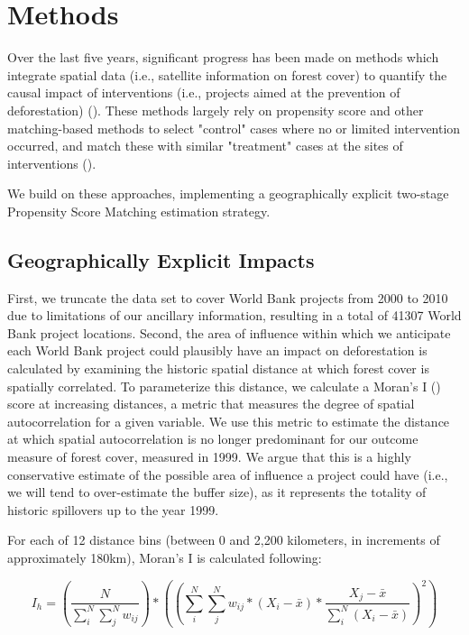\documentclass{article}\usepackage[]{graphicx}\usepackage[]{color}
\newenvironment{knitrout}{}{}  %
\begin{document}
\begin{knitrout}
\newpage
\section{Methods}
Over the last five years, significant progress has been made on methods which integrate spatial data (i.e., satellite information on forest cover) to quantify the causal impact of interventions (i.e., projects aimed at the prevention of deforestation) (\cite{nelson_effectiveness_2011}).  
These methods largely rely on propensity score and other matching-based methods to select "control" cases where no or limited intervention occurred, and match these with similar "treatment" cases at the sites of interventions (\cite{andam_measuring_2008}). 

We build on these approaches, implementing a geographically explicit two-stage Propensity Score Matching estimation strategy. 
\subsection{Geographically Explicit Impacts}
First, we truncate the data set to cover World Bank projects from 2000 to 2010 due to limitations of our ancillary information, resulting in a total of 41307 World Bank project locations.
Second, the area of influence within which we anticipate each World Bank project could plausibly have an impact on deforestation is calculated by examining the historic spatial distance at which forest cover is spatially correlated. To parameterize this distance, we calculate a Moran's I (\cite{getis_analysis_1992}) score at increasing distances, a metric that measures the degree of spatial autocorrelation for a given variable.
We use this metric to estimate the distance at which spatial autocorrelation is no longer predominant for our outcome measure of forest cover, measured in 1999.  
We argue that this is a highly conservative estimate of the possible area of influence a project could have (i.e., we will tend to over-estimate the buffer size), as it represents the totality of historic spillovers up to the year 1999.
\par
For each of 12 distance bins (between 0 and 2,200 kilometers, in increments of approximately 180km), Moran's I is calculated following:

\begin{equation}
I_h = (\frac{N}{\sum_{i}^{N}\sum_{j}^{N}w_{ij}}) * ((\sum_{i}^{N}\sum_{j}^{N}w_{ij} * (X_{i}-\bar{x}) * \frac{X_{j} - \bar{x}}{\sum_{i}^{N}(X_{i}-\bar{x})})^{2})
\label{EQmoran}
\end{equation}


\end{knitrout}
\end{document}
